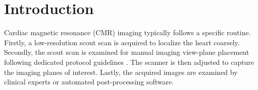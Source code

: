\section{Introduction}
    \label{sec:introduction}
     Cardiac magnetic resonance (CMR) imaging typically follows a specific routine. Firstly, a low-resolution scout scan is acquired to localize the heart coarsely.
    Secondly, the scout scan is examined for manual imaging view-plane placement following dedicated protocol guidelines \citep{ismail2022cardiac}. The scanner is then adjusted to capture the imaging planes of interest. Lastly, the acquired images are examined by clinical experts or automated post-processing software.

